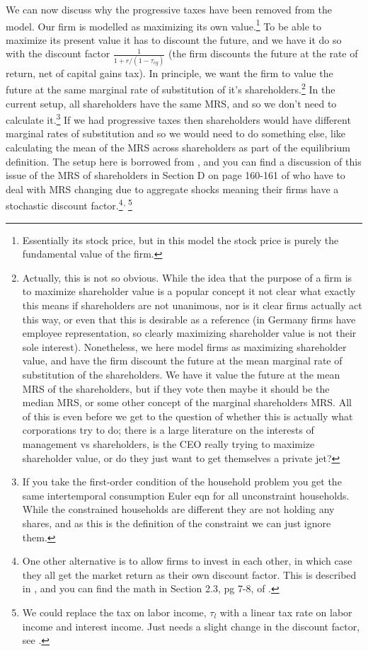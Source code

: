 We can now discuss why the progressive taxes have been removed from the model. Our firm is modelled as maximizing its own value.\footnote{Essentially its stock price, but in this model the stock price is purely the fundamental value of the firm.} To be able to maximize its present value it has to discount the future, and we have it do so with the discount factor $\frac{1}{1+r/(1-\tau_{cg})}$ (the firm discounts the future at the rate of return, net of capital gains tax). In principle, we want the firm to value the future at the same marginal rate of substitution of it's shareholders.\footnote{Actually, this is not so obvious. While the idea that the purpose of a firm is to maximize shareholder value is a popular concept it not clear what exactly this means if shareholders are not unanimous, nor is it clear firms actually act this way, or even that this is desirable as a reference (in Germany firms have employee representation, so clearly maximizing shareholder value is not their sole interest). Nonetheless, we here model firms as maximizing shareholder value, and have the firm discount the future at the mean marginal rate of substitution of the shareholders. We have it value the future at the mean MRS of the shareholders, but if they vote then maybe it should be the median MRS, or some other concept of the marginal shareholders MRS. All of this is even before we get to the question of whether this is actually what corporations try to do; there is a large literature on the interests of management vs shareholders, is the CEO really trying to maximize shareholder value, or do they just want to get themselves a private jet?} In the current setup, all shareholders have the same MRS, and so we don't need to calculate it.\footnote{If you take the first-order condition of the household problem you get the same intertemporal consumption Euler eqn for all unconstraint households. While the constrained households are different they are not holding any shares, and as this is the definition of the constraint we can just ignore them.} If we had progressive taxes then shareholders would have different marginal rates of substitution and so we would need to do something else, like calculating the mean of the MRS across shareholders as part of the equilibrium definition. The setup here is borrowed from \cite*{AnagnostopoulosAtesagaogluCarcelesPoveda2022}, and you can find a discussion of this issue of the MRS of shareholders in Section D on page 160-161 of \cite*{FavilukisLudvigsonVanNieuwerburgh2017} who have to deal with MRS changing due to aggregate shocks meaning their firms have a stochastic discount factor.\footnote{One other alternative is to allow firms to invest in each other, in which case they all get the market return as their own discount factor. This is described in \cite*{AnagnostopoulosAtesagaogluCarcelesPoveda2022}, and you can find the math in Section 2.3, pg 7-8, of \cite*{BarroBerkovich2018}.}$^{,\thinspace}$\footnote{We could replace the tax on labor income, $\tau_l$ with a linear tax rate on labor income and interest income. Just needs a slight change in the discount factor, see \cite*{GourioMiao2010}.}

